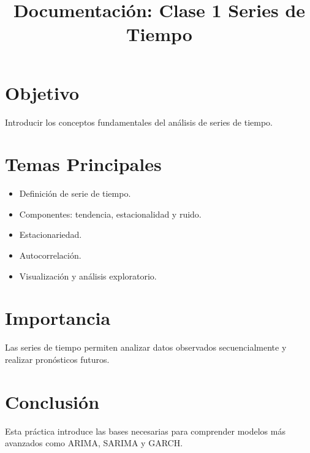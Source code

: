 \documentclass[11pt]{article}
\title{Documentación: Clase 1 Series de Tiempo}
\date{}
\begin{document}
\maketitle

\section{Objetivo}
Introducir los conceptos fundamentales del análisis de series de tiempo.

\section{Temas Principales}
\begin{itemize}
\item Definición de serie de tiempo.
\item Componentes: tendencia, estacionalidad y ruido.
\item Estacionariedad.
\item Autocorrelación.
\item Visualización y análisis exploratorio.
\end{itemize}

\section{Importancia}
Las series de tiempo permiten analizar datos observados secuencialmente y realizar pronósticos futuros.

\section{Conclusión}
Esta práctica introduce las bases necesarias para comprender modelos más avanzados como ARIMA, SARIMA y GARCH.
\end{document}
